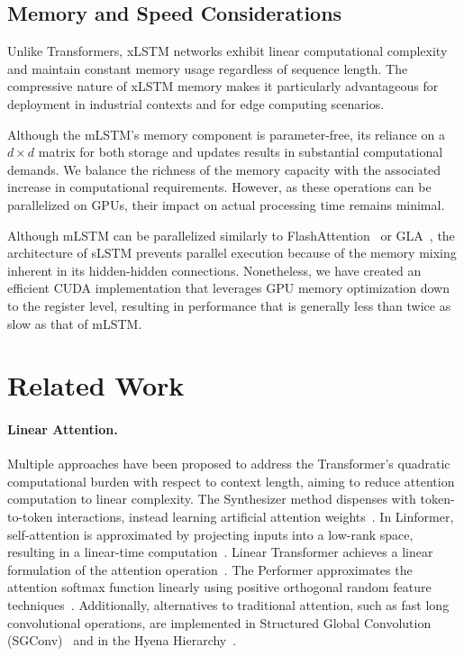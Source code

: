 \subsection{Memory and Speed Considerations}

Unlike Transformers, xLSTM networks exhibit linear computational complexity and maintain constant memory usage regardless of sequence length. The compressive nature of xLSTM memory makes it particularly advantageous for deployment in industrial contexts and for edge computing scenarios.

Although the mLSTM's memory component is parameter-free, its reliance on a $d \times d$ matrix for both storage and updates results in substantial computational demands. We balance the richness of the memory capacity with the associated increase in computational requirements. However, as these operations can be parallelized on GPUs, their impact on actual processing time remains minimal.

Although mLSTM can be parallelized similarly to FlashAttention~\citep{Dao:22,Dao:23} or GLA~\citep{Yang:23arxiv}, the architecture of sLSTM prevents parallel execution because of the memory mixing inherent in its hidden-hidden connections. Nonetheless, we have created an efficient CUDA implementation that leverages GPU memory optimization down to the register level, resulting in performance that is generally less than twice as slow as that of mLSTM.

\section{Related Work}
\label{sec:related}

\paragraph{Linear Attention.} Multiple approaches have been proposed to address the Transformer's quadratic computational burden with respect to context length, aiming to reduce attention computation to linear complexity. The Synthesizer method dispenses with token-to-token interactions, instead learning artificial attention weights~\citep{Tay:20arxiv}. In Linformer, self-attention is approximated by projecting inputs into a low-rank space, resulting in a linear-time computation~\citep{Wang:20arxiv}. Linear Transformer achieves a linear formulation of the attention operation~\citep{Katharopoulos:20}. The Performer approximates the attention softmax function linearly using positive orthogonal random feature techniques~\citep{Choromanski:21}. Additionally, alternatives to traditional attention, such as fast long convolutional operations, are implemented in Structured Global Convolution (SGConv)~\citep{Li:22} and in the Hyena Hierarchy~\citep{Poli:23}.

